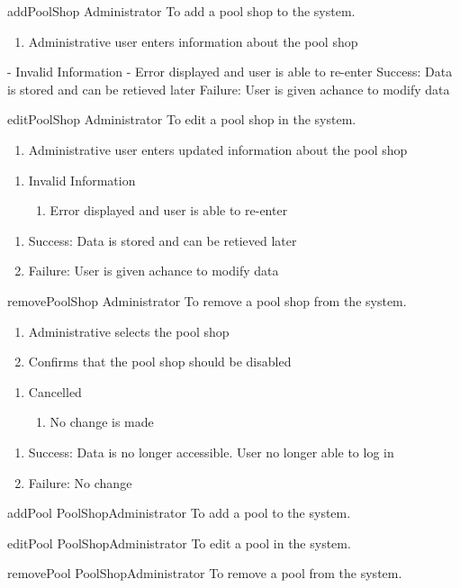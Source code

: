\usecase
{addPoolShop}
{Administrator}
{To add a pool shop to the system.}
{}
{
\begin{enumerate}
\item Administrative user enters information about the pool shop
\end{enumerate}
}
{  - Invalid Information
    - Error displayed and user is able to re-enter}
{Success: Data is stored and can be retieved later
Failure: User is given achance to modify data}

\usecase
{editPoolShop}
{Administrator}
{To edit a pool shop in the system.}
{}
{
\begin{enumerate}
\item Administrative user enters updated information about the pool shop
\end{enumerate}
}
{
\begin{enumerate}
\item Invalid Information
\begin{enumerate}
\item Error displayed and user is able to re-enter
\end{enumerate}
\end{enumerate}
}
{
\begin{enumerate}
\item Success: Data is stored and can be retieved later
\item Failure: User is given achance to modify data
\end{enumerate}
}

\usecase
{removePoolShop}
{Administrator}
{To remove a pool shop from the system.}
{}
{
\begin{enumerate}
\item Administrative selects the pool shop
\item Confirms that the pool shop should be disabled
\end{enumerate}}
{
\begin{enumerate}
\item Cancelled
\begin{enumerate}
\item No change is made
\end{enumerate}
\end{enumerate}
}
{
\begin{enumerate}
\item Success: Data is no longer accessible. User no longer able to log in
\item Failure: No change
\end{enumerate}
}

\usecase
{addPool}
{PoolShopAdministrator}
{To add a pool to the system.}
{}
{}
{}
{}

\usecase
{editPool}
{PoolShopAdministrator}
{To edit a pool in the system.}
{}
{}
{}
{}

\usecase
{removePool}
{PoolShopAdministrator}
{To remove a pool from the system.}
{}
{}
{}
{}




